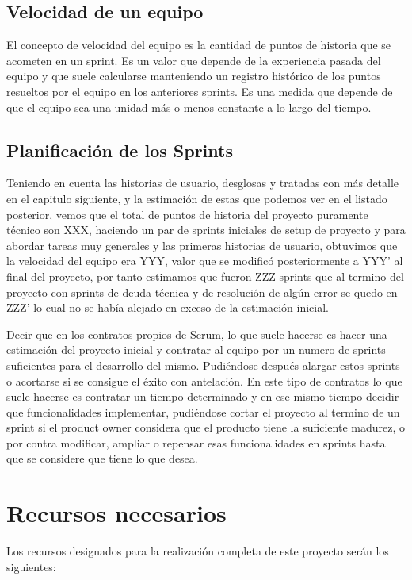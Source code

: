 \documentclass[../pfc.tex]{subfiles}
\begin{document}
	\subsection{Velocidad de un equipo}
	
	El concepto de velocidad del equipo es la cantidad de puntos de historia que se acometen en un sprint. Es un valor que depende de la experiencia pasada del equipo y que suele calcularse manteniendo un registro histórico de los puntos resueltos por el equipo en los anteriores sprints. Es una medida que depende de que el equipo sea una unidad más o menos constante a lo largo del tiempo. 
	
	\subsection{Planificación de los Sprints}   
	
	Teniendo en cuenta las historias de usuario, desglosas y tratadas con más detalle en el capitulo siguiente, y la estimación de estas que podemos ver en el listado posterior, vemos que el total de puntos de historia del proyecto puramente técnico son XXX, haciendo un par de sprints iniciales de setup de proyecto y para abordar tareas muy generales y las primeras historias de usuario, obtuvimos que la velocidad del equipo era YYY, valor que se modificó posteriormente a YYY' al final del proyecto, por tanto estimamos que fueron ZZZ sprints que al termino del proyecto con sprints de deuda técnica y de resolución de algún error se quedo en ZZZ' lo cual no se había alejado en exceso de la estimación inicial. 
	
	Decir que en los contratos propios de Scrum, lo que suele hacerse es hacer una estimación del proyecto inicial y contratar al equipo por un numero de sprints suficientes para el desarrollo del mismo. Pudiéndose después alargar estos sprints o acortarse si se consigue el éxito con antelación. En este tipo de contratos lo que suele hacerse es contratar un tiempo determinado y en ese mismo tiempo decidir que funcionalidades implementar, pudiéndose cortar el proyecto al termino de un sprint si el product owner considera que el producto tiene la suficiente madurez, o por contra modificar, ampliar o repensar esas funcionalidades en sprints hasta que se considere que tiene lo que desea. 
	
	
	\section{Recursos necesarios}
	Los recursos designados para la realización completa de este proyecto serán los siguientes:\\
	
\end{document}
